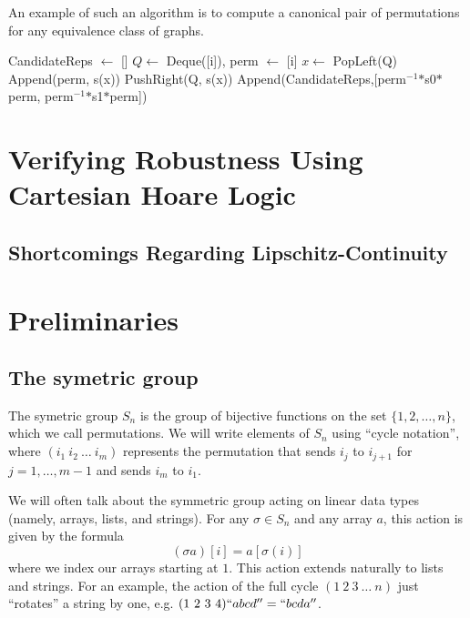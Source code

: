 \documentclass{llncs}
\begin{document}
An example of such an algorithm is to compute a canonical pair of permutations for any equivalence class of graphs.

\begin{algorithm}
\begin{algorithmic}[1]
\State CandidateReps \(\gets\) []
\State \(Q \gets \) Deque([i]), perm \(\gets\) [i]
\State \(x\gets\) PopLeft(Q)
\State Append(perm, s(x))
\State PushRight(Q, s(x))
\EndIf
\EndFor
\EndWhile
\State Append(CandidateReps,[perm\(^{-1}\)\(*\)s0\(*\)perm, perm\(^{-1}\)\(*\)s1\(*\)perm])
\EndFor
{}
\EndFunction
\end{algorithmic}
\end{algorithm}

\section{Verifying Robustness Using Cartesian Hoare Logic}


\subsection{Shortcomings Regarding Lipschitz-Continuity}


\section{Preliminaries}

\subsection{The symetric group}
The symetric group $S_n$ is the group of bijective functions on the set $\{1,2,\ldots, n\}$, which we call permutations. We will write elements of $S_n$ using ``cycle notation'', where $(i_1\ i_2\ \ldots\ i_m)$ represents the permutation that sends $i_j$ to $i_{j+1}$ for $j=1,\ldots, m-1$ and sends $i_m$ to $i_1$.

We will often talk about the symmetric group acting on linear data types (namely, arrays, lists, and strings). For any $\sigma \in S_n$ and any array $a$, this action is given by the formula
$$ (\sigma a)[i] = a[\sigma(i)] $$
where we index our arrays starting at $1$. This action extends naturally to lists and strings. For an example, the action of the full cycle $(1\ 2\ 3\ \ldots\ n)$ just ``rotates'' a string by one, e.g. $(1\ 2\ 3\ 4)``abcd'' = ``bcda''$.
\end{document}
